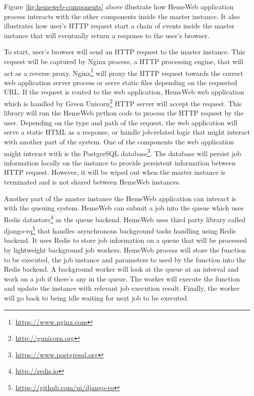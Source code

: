 \vspace{1cm}

Figure \ref{fig:hemeweb-components} above illustrate how HemeWeb  application process interacts with the other components inside the master instance. It also illustrates how user's HTTP request start a chain of events inside the master instance that will eventually return a response to the user's browser.

To start, user's browser will send an HTTP request to the master instance. This request will be captured by Nginx process, a HTTP processing engine, that will act as a reverse proxy.  Nginx\footnote{\url{https://www.nginx.com}} will proxy the HTTP request towards the correct web application server process or serve static files depending on the requested URL. If the request is routed to the web application, HemeWeb web application which is handled by Green Unicorn\footnote{\url{http://gunicorn.org}} HTTP server will accept the request. This library will run the HemeWeb python code to process the HTTP request by the user. Depending on the type and path of the request, the web application will serve a static HTML as a response, or handle job-related logic that might interact with another part of the system. One of the components the web application might interact with is the PostgreSQL database\footnote{\url{https://www.postgresql.org}}. The database will persist job information locally on the instance to provide persistent information between HTTP request. However, it will be wiped out when the master instance is terminated and is not shared between HemeWeb instances.

Another part of the master instance the HemeWeb application can interact is with the queuing system. HemeWeb can submit a job into the queue which uses Redis datastore\footnote{\url{http://redis.io}} as the queue backend. HemeWeb uses third party library called django-rq\footnote{\url{https://github.com/ui/django-rq}} that handles asynchronous background tasks handling using Redis backend. It uses Redis to store job information on a queue that will be processed by lightweight background job workers. HemeWeb process will store the function to be executed, the job instance and parameters to used by the function into the Redis backend. A background worker will look at the queue at an interval and work on a job if there's any in the queue. The worker will execute the function and update the instance with relevant job execution result. Finally, the worker will go back to being idle waiting for next job to be executed.

